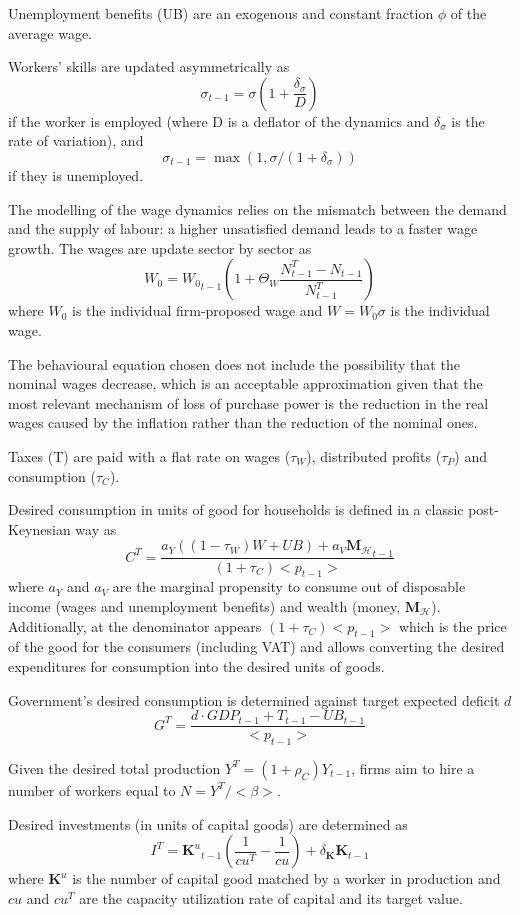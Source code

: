 \documentclass[]{article}
\begin{document}
Unemployment benefits (UB) are an exogenous and constant fraction $\phi$ of the average wage.

Workers' skills are updated asymmetrically as 
$$\sigma_{t-1} = \sigma (1+\frac{\delta_\sigma}{D})$$
if the worker is employed (where D is a deflator of the dynamics and $\delta_\sigma$ is the rate of variation), and
$$\sigma_{t-1} = \max(1,\sigma / (1+\delta_\sigma))$$ if they is unemployed.

The modelling of the wage dynamics relies on the mismatch between the demand and the supply of labour: a higher unsatisfied demand leads to a faster wage growth.
The wages are update sector by sector as $$W_0 =  {W_0}_{t-1} (1 + \Theta_W \frac{N^T_{t-1} - N_{t-1}}{N^T_{t-1}})$$ where $W_0$ is the individual firm-proposed wage and $W = W_0 \sigma$ is the individual wage.

The behavioural equation chosen does not include the possibility that the nominal wages decrease, which is an acceptable approximation given that the most relevant mechanism of loss of purchase power is the reduction in the real wages caused by the inflation rather than the reduction of the nominal ones.

Taxes (T) are paid with a flat rate on wages ($\tau_W$), distributed profits ($\tau_P$) and consumption ($\tau_C$).

Desired consumption in units of good for households is defined in a classic post-Keynesian way as $$C^T = \frac{a_Y ((1 - \tau_W) W + UB) + a_V {\mathbf{M}_\mathcal{H}}_{t-1}}{(1 + \tau_C) <p_{t-1}>}$$
where $a_Y$ and $a_V$ are the marginal propensity to consume out of disposable income (wages and unemployment benefits) and wealth (money, $\mathbf{M}_\mathcal{H}$).
Additionally, at the denominator appears $(1 + \tau_C) <p_{t-1}>$ which is the price of the good for the consumers (including VAT) and allows converting the desired expenditures for consumption into the desired units of goods.

Government's desired consumption is determined against target expected deficit $d$ $$G^T = \frac{d \cdot {GDP}_{t-1} + T_{t-1} - UB_{t-1}}{<p_{t-1}>}$$

Given the desired total production $Y^T = (1+\rho_C)Y_{t-1}$, firms aim to hire a number of workers equal to $N = Y^T/<\beta>$.

Desired investments (in units of capital goods) are determined as $$I^T = {\mathbf{K}^u}_{t-1} (\frac{1}{{cu}^T} - \frac{1}{{cu}}) + \delta_\mathbf{K} \mathbf{K}_{t-1}$$ where $\mathbf{K}^u$ is the number of capital good matched by a worker in production and $cu$ and ${cu}^T$ are the capacity utilization rate of capital and its target value.
\end{document}
